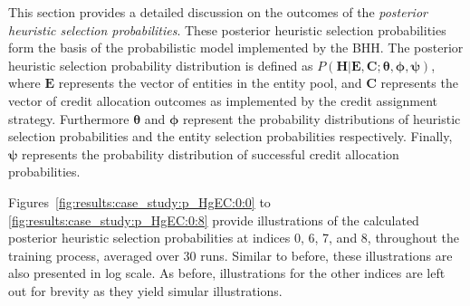This section provides a detailed discussion on the outcomes of the \textit{posterior heuristic selection probabilities}. These posterior heuristic selection probabilities form the basis of the probabilistic model implemented by the \acs{BHH}. The posterior heuristic selection probability distribution is defined as $P(\boldsymbol{H} \vert \boldsymbol{E}, \boldsymbol{C}; \boldsymbol{\theta}, \boldsymbol{\phi}, \boldsymbol{\psi})$, where $\boldsymbol{E}$ represents the vector of entities in the entity pool, and $\boldsymbol{C}$ represents the vector of credit allocation outcomes as implemented by the credit assignment strategy. Furthermore $\boldsymbol{\theta}$ and $\boldsymbol{\phi}$ represent the probability distributions of heuristic selection probabilities and the entity selection probabilities respectively. Finally, $\boldsymbol{\psi}$ represents the probability distribution of successful credit allocation probabilities.

Figures~\ref{fig:results:case_study:p_HgEC:0:0} to \ref{fig:results:case_study:p_HgEC:0:8} provide illustrations of the calculated posterior heuristic selection probabilities at indices 0, 6, 7, and 8, throughout the training process, averaged over 30 runs. Similar to before, these illustrations are also presented in log scale. As before, illustrations for the other indices are left out for brevity as they yield simular illustrations.

